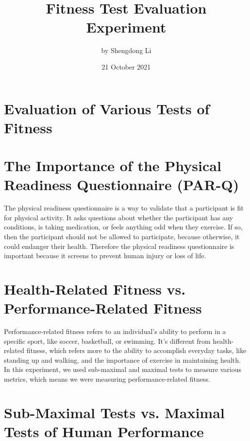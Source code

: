 \documentclass[12pt]{article}
\begin{document}
\title{Fitness Test Evaluation Experiment}
\author{by Shengdong Li}
\date{21 October 2021}
\maketitle

\section*{Evaluation of Various Tests of Fitness}



\section*{The Importance of the Physical Readiness Questionnaire (PAR-Q)}

The physical readiness questionnaire is a way to validate that a participant is fit for physical activity. It asks questions about whether the participant has any conditions, is taking medication, or feels anything odd when they exercise. If so, then the participant should not be allowed to participate, because otherwise, it could endanger their health. Therefore the physical readiness questionnaire is important because it screens to prevent human injury or loss of life.

\section*{Health-Related Fitness vs. Performance-Related Fitness}

Performance-related fitness refers to an individual's ability to perform in a specific sport, like soccer, basketball, or swimming. It's different from health-related fitness, which refers more to the ability to accomplish everyday tasks, like standing up and walking, and the importance of exercise in maintaining health. In this experiment, we used sub-maximal and maximal tests to measure various metrics, which means we were measuring performance-related fitness.

\section*{Sub-Maximal Tests vs. Maximal Tests of Human Performance}
\end{document}
